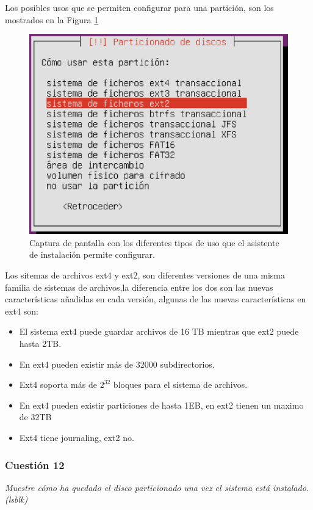Los posibles usos que se permiten configurar para una partición, son los mostrados en la Figura \ref{fig2}
\begin{figure}[H]
    \begin{center}
        \includegraphics[scale=0.5]{Imagenes/tipos_usos_particiones.eps}
        \caption{Captura de pantalla con los diferentes tipos de uso que el asistente de instalación permite configurar.}
        \label{fig2}
    \end{center}
\end{figure}

Los sitemas de archivos ext4 y ext2, son diferentes versiones de una misma familia de sistemas de archivos,la diferencia entre los dos son las nuevas características añadidas en cada versión, algunas de las nuevas características en ext4 son:\cite{ext} \cite{ext1}
\begin{itemize}
    \item El sistema ext4 puede guardar archivos de 16 TB mientras que ext2 puede hasta 2TB.
    \item En ext4 pueden existir más de  32000 subdirectorios.
    \item Ext4 soporta más de $ 2^{32} $ bloques para el sistema de archivos.
    \item En ext4 pueden existir particiones de hasta 1EB, en ext2 tienen un maximo de 32TB
    \item Ext4 tiene journaling, ext2 no.
\end{itemize}

\subsubsection{Cuestión 12}
\textit{Muestre cómo ha quedado el disco particionado una vez el sistema está instalado. (lsblk)} \newline


